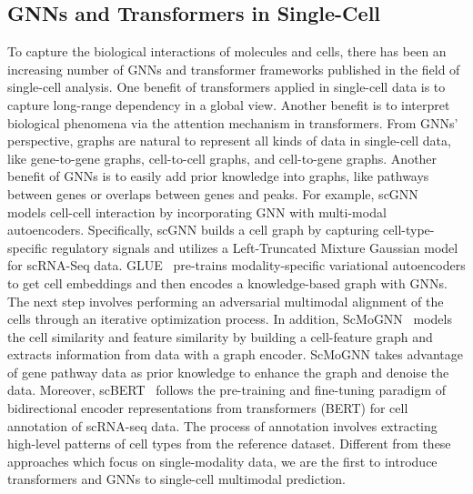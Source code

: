 \subsection{GNNs and Transformers in Single-Cell} %
To capture the biological interactions of molecules and cells, there has been an increasing number of GNNs and transformer frameworks published in the field of single-cell analysis. 
One benefit of transformers applied in single-cell data is to capture long-range dependency in a global view. Another benefit is to interpret biological phenomena via the attention mechanism in transformers.
From GNNs' perspective, graphs are natural to represent all kinds of data in single-cell data, like gene-to-gene graphs, cell-to-cell graphs, and cell-to-gene graphs. Another benefit of GNNs is to easily add prior knowledge into graphs, like pathways between genes or overlaps between genes and peaks. %
For example, scGNN~\cite{wang2021scgnn} models cell-cell interaction by incorporating GNN with multi-modal autoencoders. Specifically, scGNN builds a cell graph by capturing cell-type-specific regulatory signals and utilizes a Left-Truncated Mixture Gaussian model for scRNA-Seq data. GLUE~\cite{cao2022multi} pre-trains modality-specific variational autoencoders to get cell embeddings and then encodes a knowledge-based graph with GNNs. The next step involves performing an adversarial multimodal alignment of the cells through an iterative optimization process. In addition, ScMoGNN~\cite{wen2022graph} models the cell similarity and feature similarity by building a cell-feature graph and extracts information from data with a graph encoder. ScMoGNN takes advantage of gene pathway data as prior knowledge to enhance the graph and denoise the data. Moreover, scBERT~\cite{yang2022scbert} follows the pre-training and fine-tuning paradigm of bidirectional encoder representations from transformers (BERT) for cell annotation of scRNA-seq data. The process of annotation involves extracting high-level patterns of cell types from the reference dataset. Different from these approaches which focus on single-modality data,  we are the first to introduce transformers and GNNs to single-cell multimodal prediction. 